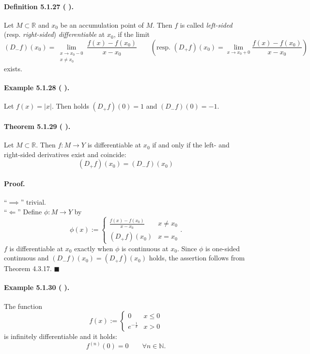 \documentclass[12pt]{article}
\newcommand{\N}{\mathbb{N}}
\newcommand{\R}{\mathbb{R}}
\newcommand{\NumberedDefinition}[3]{%
\paragraph*{Definition #1 ( #2 ).} #3\par}
\newcommand{\NumberedTheorem}[3]{%
\paragraph*{Theorem #1 ( #2 ).} #3\par}
\newcommand{\NumberedExample}[3]{%
\paragraph*{Example #1 ( #2 ).} #3\par}
\begin{document}
\NumberedDefinition{5.1.27}{}{Let $M \subset \R$ and $x_0$ be an accumulation point of $M$. Then $f$ is called \textit{left-sided} (resp. \textit{right-sided}) \textit{differentiable} at $x_0$, if the limit
\[
(D_-f)(x_0) = \lim_{\substack{x \to x_0 - 0 \\ x \neq x_0}} \frac{f(x) - f(x_0)}{x - x_0} \qquad \left( \text{resp. } (D_+f)(x_0) = \lim_{x \to x_0 + 0} \frac{f(x) - f(x_0)}{x - x_0} \right)
\]
exists.}

\NumberedExample{5.1.28}{}{Let $f(x) = |x|$. Then holds $(D_+f)(0) = 1$ and $(D_-f)(0) = -1$.}

\NumberedTheorem{5.1.29}{}{Let $M \subset \R$. Then $f : M \to Y$ is differentiable at $x_0$ if and only if the left- and right-sided derivatives exist and coincide:
\[
(D_+f)(x_0) = (D_-f)(x_0)
\]
}

\paragraph*{Proof.}
``$\implies$'' trivial. \\
``$\Longleftarrow$'' Define $\phi : M \to Y$ by
\[
\phi(x) := \begin{cases} \frac{f(x)-f(x_0)}{x-x_0} & x \neq x_0 \\ (D_+f)(x_0) & x = x_0 \end{cases}.
\]
$f$ is differentiable at $x_0$ exactly when $\phi$ is continuous at $x_0$. Since $\phi$ is one-sided continuous and $(D_-f)(x_0) = (D_+f)(x_0)$ holds, the assertion follows from Theorem 4.3.17. \hfill $\blacksquare$

\NumberedExample{5.1.30}{}{The function
\[
f(x) := \begin{cases} 0 & x \le 0 \\ e^{-\frac{1}{x}} & x > 0 \end{cases}
\]
is infinitely differentiable and it holds:
\[
f^{(n)}(0) = 0 \qquad \forall n \in \N.
\]
}
\end{document}
